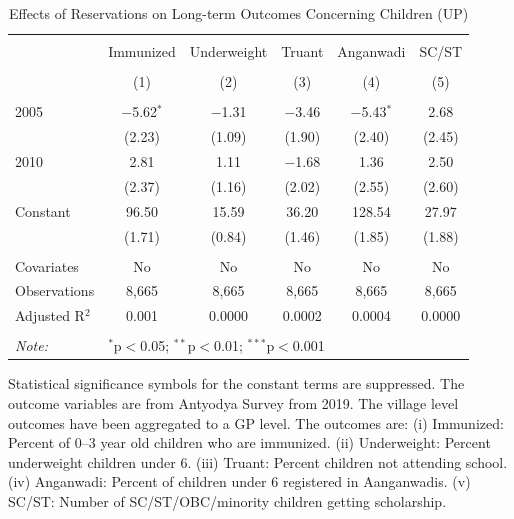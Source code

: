 \begin{table}[!htbp]
\centering
\begin{threeparttable}

  \caption{Effects of Reservations on Long-term Outcomes Concerning Children (UP)} 
  \label{up_shrug_children_05_10} 
\scriptsize 
\begin{tabular}{@{\extracolsep{0pt}}lccccc} 
\\[-1.8ex]\hline 
\hline \\[-1.8ex] 
 & Immunized & Underweight & Truant & Anganwadi & SC/ST \\ 
\\[-1.8ex] & (1) & (2) & (3) & (4) & (5)\\ 
\hline \\[-1.8ex] 
 2005 & $-$5.62$^{*}$ & $-$1.31 & $-$3.46 & $-$5.43$^{*}$ & 2.68 \\ 
  & (2.23) & (1.09) & (1.90) & (2.40) & (2.45) \\ 
  2010 & 2.81 & 1.11 & $-$1.68 & 1.36 & 2.50 \\ 
  & (2.37) & (1.16) & (2.02) & (2.55) & (2.60) \\ 
  Constant & 96.50 & 15.59 & 36.20 & 128.54 & 27.97 \\ 
  & (1.71) & (0.84) & (1.46) & (1.85) & (1.88) \\ 
 \hline \\[-1.8ex] 
Covariates & No & No & No & No & No \\ 
Observations & 8,665 & 8,665 & 8,665 & 8,665 & 8,665 \\ 
Adjusted R$^{2}$ & 0.001 & 0.0000 & 0.0002 & 0.0004 & 0.0000 \\ 
\hline 
\hline \\[-1.8ex] 
\textit{Note:}  & \multicolumn{5}{l}{$^{*}$p$<$0.05; $^{**}$p$<$0.01; $^{***}$p$<$0.001} \\ 
\end{tabular} 
\begin{tablenotes}[flushleft]
\scriptsize
\item[] Statistical significance symbols for the constant terms are suppressed. The outcome variables are from Antyodya Survey from 2019.
                   The village level outcomes have been aggregated to a GP level. The outcomes are:
                   (i) Immunized: Percent of 0--3 year old children who are immunized.
                   (ii) Underweight: Percent underweight children under 6.
                   (iii) Truant: Percent children not attending school.
                   (iv) Anganwadi: Percent of children under 6 registered in Aanganwadis.
                   (v) SC/ST: Number of SC/ST/OBC/minority children getting scholarship.
\end{tablenotes}
\end{threeparttable}
\end{table}
